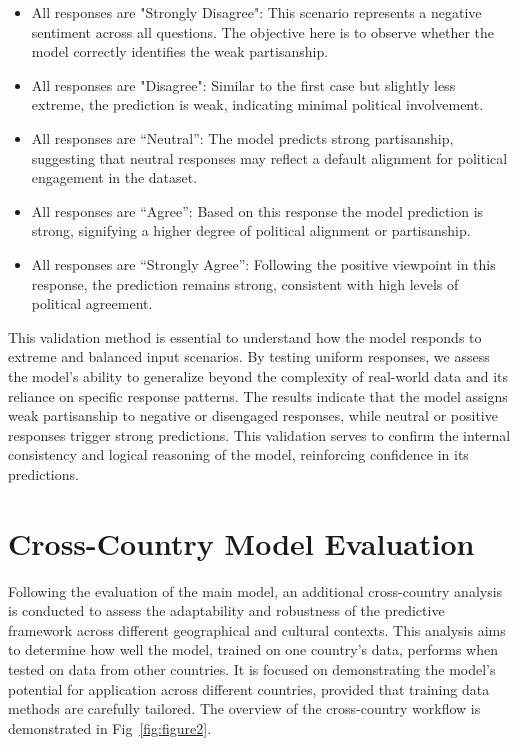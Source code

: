 \documentclass[pt]{article}  %
\begin{document}
\begin{itemize}
    \item All responses are "Strongly Disagree":
   This scenario represents a negative sentiment across all questions. The objective here is to observe whether the model correctly identifies the weak partisanship.

\item All responses are "Disagree":
Similar to the first case but slightly less extreme, the prediction is weak, indicating minimal political involvement.

\item All responses are “Neutral”:
The model predicts strong partisanship, suggesting that neutral responses may reflect a default alignment for political engagement in the dataset.

\item All responses are “Agree”:
Based on this response the model prediction is strong, signifying a higher degree of political alignment or partisanship.

\item All responses are “Strongly Agree”:
Following the positive viewpoint in this response, the prediction remains strong, consistent with high levels of political agreement. 
\end{itemize}

This validation method is essential to understand how the model responds to extreme and balanced input scenarios. By testing uniform responses, we assess the model's ability to generalize beyond the complexity of real-world data and its reliance on specific response patterns. The results indicate that the model assigns weak partisanship to negative or disengaged responses, while neutral or positive responses trigger strong predictions. This validation serves to confirm the internal consistency and logical reasoning of the model, reinforcing confidence in its predictions. 


\section{Cross-Country Model Evaluation } Following the evaluation of the main model, an additional cross-country analysis is conducted to assess the adaptability and robustness of the predictive framework across different geographical and cultural contexts. This analysis aims to determine how well the model, trained on one country’s data, performs when tested on data from other countries. It is focused on demonstrating the model’s potential for application across different countries, provided that training data methods are carefully tailored. The overview of the cross-country workflow is demonstrated in Fig~\ref{fig:figure2}.\vspace{0.3cm}
\end{document}
